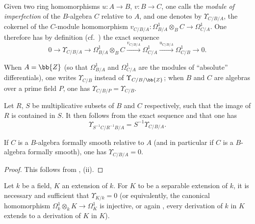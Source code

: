 \begin{definition}[20.6.1]
\label{0.20.6.1}
Given two ring homomorphisms $u:A\to B$, $v:B\to C$, one calls the \emph{module of imperfection} of the $B$-algebra $C$ relative to $A$, and one denotes by $\Upsilon_{C/B/A}$, the cokernel of the $C$-module homomorphism $v_{C/B/A}:\Omega^1_{B/A}\otimes_B C\to\Omega^1_{C/A}$.
One therefore has by definition (cf.\ ) the exact sequence
\begin{equation}
\tag{20.6.1.1}
  \label{0.20.6.1.1}
  0\to\Upsilon_{C/B/A}\to\Omega^1_{B/A}\otimes_B C\xrightarrow{v_{C/B/A}}\Omega^1_{C/A}\xrightarrow{u_{C/B/A}}\Omega^1_{C/B}\to 0.
\end{equation}
\end{definition}

When $A=\bb{Z}$ (so that $\Omega^1_{B/A}$ and $\Omega^1_{C/A}$ are the modules of ``absolute'' differentials), one writes $\Upsilon_{C/B}$ instead of $\Upsilon_{C/B/\bb{Z}}$; when $B$ and $C$ are algebras over a prime field $P$, one has $\Upsilon_{C/B/P}=\Upsilon_{C/B}$.

Let $R$, $S$ be multiplicative subsets of $B$ and $C$ respectively, such that the image of $R$ is contained in $S$.
It then follows from the exact sequence  and  that one has
\begin{equation}
\tag{20.6.1.2}
  \label{0.20.6.1.2}
  \Upsilon_{S^{-1}C/R^{-1}B/A}=S^{-1}\Upsilon_{C/B/A}.
\end{equation}

\begin{proposition}[20.6.2]
\label{0.20.6.2}
If $C$ is a $B$-algebra formally smooth relative to $A$ \textup{(}and in particular if $C$ is a $B$-algebra formally smooth\textup{)}, one has $\Upsilon_{C/B/A}=0$.
\end{proposition}

\begin{proof}
This follows from , (ii).
\end{proof}

\begin{proposition}[20.6.3]
\label{0.20.6.3}
Let $k$ be a field, $K$ an extension of $k$.
For $K$ to be a separable extension of $k$, it is necessary and sufficient that $\Upsilon_{K/k}=0$ \textup{(}or equivalently, the canonical homomorphism $\Omega^1_k\otimes_k K\to\Omega^1_K$ is injective, or again , every derivation of $k$ in $K$ extends to a derivation of $K$ in $K$\textup{)}.
\end{proposition}

